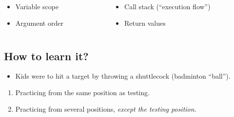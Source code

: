 \begin{frame}[fragile]\label{vtprogid}
  \begin{example}
  \end{example}

  \begin{example}
    \begin{columns}
      \begin{column}{0.4\columnwidth}
        \begin{itemize}
          \item Variable scope
          \item Argument order
        \end{itemize}
      \end{column}
      \begin{column}{0.5\columnwidth}
        \begin{itemize}
          \item Call stack (\enquote{execution flow})
          \item Return values
        \end{itemize}
      \end{column}
    \end{columns}
  \end{example}
\end{frame}

\subsection{How to learn it?}

\begin{frame}
  \begin{example}
    \begin{itemize}
      \item Kids were to hit a target by throwing a shuttlecock (badminton 
        \enquote{ball}).
    \end{itemize}
    \begin{enumerate}
      \item Practicing from the same position as testing.
      \item Practicing from several positions, \emph{except the testing 
        position}.
    \end{enumerate}
  \end{example}
\end{frame}

